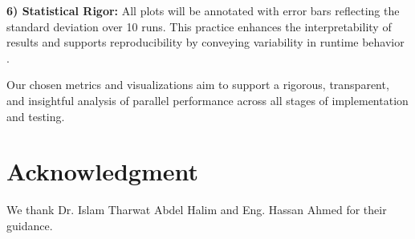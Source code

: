 \documentclass[conference, 10pt]{IEEEtran}
\begin{document}
\vspace{0.5em}
\textbf{6) Statistical Rigor:} 
All plots will be annotated with error bars reflecting the standard deviation over 10 runs. This practice enhances the interpretability of results and supports reproducibility by conveying variability in runtime behavior \cite{Yoon2012}.

Our chosen metrics and visualizations aim to support a rigorous, transparent, and insightful analysis of parallel performance across all stages of implementation and testing.









\section*{Acknowledgment} 
We thank Dr. Islam Tharwat Abdel Halim and Eng. Hassan Ahmed for their guidance.


 
\end{document}
